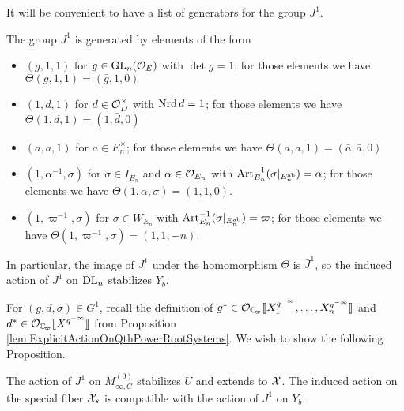 \documentclass[../main.tex]{subfiles}
\begin{document}
It will be convenient to have a list of generators for the group $J^1$. 
\begin{lem}\label{lem:GeneratorsForJ1}
  The group $J^1$ is generated by elements of the form
  \begin{itemize}
    \item $(g,1,1)$ for $g \in \operatorname{GL}_n(\mathcal{O}_E)$ with $\det g = 1$; for those
      elements we have $\Theta(g,1,1) = (\bar g, 1,0)$
    \item $(1,d,1)$ for $d \in \mathcal{O}_D^\times$ with $\operatorname{Nrd} d = 1$; for those
      elements we have $\Theta(1,d,1) = (1 , \bar d,0)$
    \item $(a,a,1)$ for $a \in E_n^\times$; for those
      elements we have $\Theta(a,a,1) = (\bar a, \bar a,0)$
    \item $(1, \alpha^{-1}, \sigma)$ for $\sigma \in I_{E_n}$ 
      and $\alpha \in \mathcal{O}_{E_n}$ with $\mathrm{Art}_{E_n}^{-1}(\sigma|_{E_n^{\mathrm{ab}}}) = \alpha$;
      for those elements we have $\Theta(1,\alpha,\sigma) = (1, 1,0)$.
    \item $(1, \varpi^{-1}, \sigma)$ for $\sigma \in W_{E_n}$ with
      $\mathrm{Art}^{-1}_{E_n}(\sigma|_{E_n^{\mathrm{ab}}}) = \varpi$; for those
      elements we have $\Theta(1,\varpi^{-1},\sigma) = (1, 1, -n)$. 
  \end{itemize}
  \end{lem}
In particular, the image of $J^1$ under the homomorphism $\Theta$ is 
$\bar J^1$, so the induced action of $J^1$ on $\mathrm{DL}_n$ stabilizes $Y_b$.

For $(g,d,\sigma) \in G^1$, recall the definition of $g^* \in \cO_\Cp\llbr
X_1^{q^{-\infty}}, \dots, X_n^{q^{-\infty}}\rrbr$ and 
$d^* \in \cO_\Cp \llbr X^{q^{-\infty}} \rrbr$ from Proposition
\ref{lem:ExplicitActionOnQthPowerRootSystems}. 
We wish to show the following Proposition.

\begin{prop}\label{prop:J1ActionOnAffinoid}
  The action of $J^1$ on $M_{\infty, C}^{(0)}$ stabilizes $U$ and extends to
  $\mathcal{X}$. The induced action on the special fiber $\mathcal{X}_s$ is compatible with the
  action of $J^1$ on $Y_b$.
\end{prop}
\end{document}
